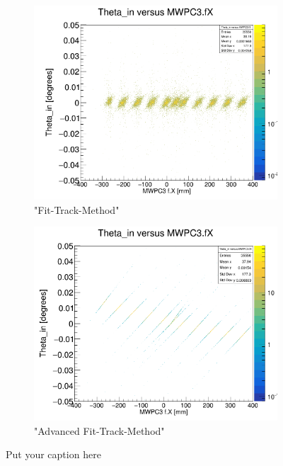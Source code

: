 \documentclass[12pt, letterpaper]{article}
\begin{document}
\begin{figure}[!htbp]
\begin{subfigure}{.5\textwidth}
  \label{fig:sub-second}
\end{subfigure}
\begin{subfigure}{.5\textwidth}
  \centering
  \includegraphics[width=.9\linewidth]{plot_imgs/theta_in_mw3_fit.png} 
  \caption{"Fit-Track-Method"}
  \label{fig:sub-second}
\end{subfigure}
\begin{subfigure}{.5\textwidth}
  \centering
  \includegraphics[width=.9\linewidth]{plot_imgs/theta_in_mw3_last.png} 
  \caption{"Advanced Fit-Track-Method"}
  \label{fig:sub-second}
\end{subfigure}
\caption{Put your caption here}
\label{fig:fig}
\end{figure}
\FloatBarrier
\clearpage
\end{document}
